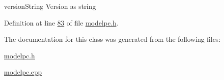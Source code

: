 version\-String Version as string 



Definition at line \hyperlink{modelpc_8h_source_l00083}{83} of file \hyperlink{modelpc_8h_source}{modelpc.\-h}.



The documentation for this class was generated from the following files\-:\begin{DoxyCompactItemize}
\item 
\hyperlink{modelpc_8h}{modelpc.\-h}\item 
\hyperlink{modelpc_8cpp}{modelpc.\-cpp}\end{DoxyCompactItemize}
